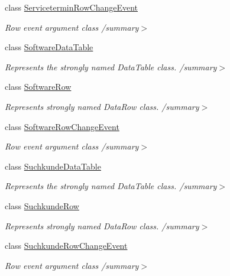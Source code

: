 \begin{DoxyCompactItemize}
class \hyperlink{class_products_1_1_data_1_1ds_sage_1_1_servicetermin_row_change_event}{Servicetermin\+Row\+Change\+Event}
\begin{DoxyCompactList}\small\item\em Row event argument class /summary$>$ \end{DoxyCompactList}\item 
class \hyperlink{class_products_1_1_data_1_1ds_sage_1_1_software_data_table}{Software\+Data\+Table}
\begin{DoxyCompactList}\small\item\em Represents the strongly named Data\+Table class. /summary$>$ \end{DoxyCompactList}\item 
class \hyperlink{class_products_1_1_data_1_1ds_sage_1_1_software_row}{Software\+Row}
\begin{DoxyCompactList}\small\item\em Represents strongly named Data\+Row class. /summary$>$ \end{DoxyCompactList}\item 
class \hyperlink{class_products_1_1_data_1_1ds_sage_1_1_software_row_change_event}{Software\+Row\+Change\+Event}
\begin{DoxyCompactList}\small\item\em Row event argument class /summary$>$ \end{DoxyCompactList}\item 
class \hyperlink{class_products_1_1_data_1_1ds_sage_1_1_suchkunde_data_table}{Suchkunde\+Data\+Table}
\begin{DoxyCompactList}\small\item\em Represents the strongly named Data\+Table class. /summary$>$ \end{DoxyCompactList}\item 
class \hyperlink{class_products_1_1_data_1_1ds_sage_1_1_suchkunde_row}{Suchkunde\+Row}
\begin{DoxyCompactList}\small\item\em Represents strongly named Data\+Row class. /summary$>$ \end{DoxyCompactList}\item 
class \hyperlink{class_products_1_1_data_1_1ds_sage_1_1_suchkunde_row_change_event}{Suchkunde\+Row\+Change\+Event}
\begin{DoxyCompactList}\small\item\em Row event argument class /summary$>$ \end{DoxyCompactList}\item 

\end{DoxyCompactItemize}
